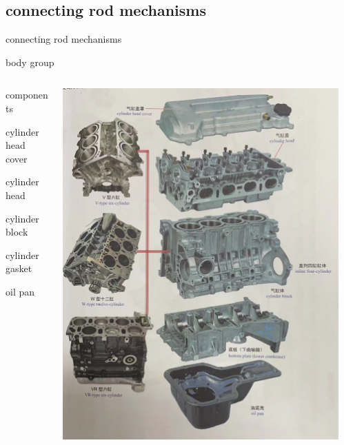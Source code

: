 \subsection{connecting rod mechanisms}
\begin{frame}{connecting rod mechanisms}
	\begin{block}{body group}
		\begin{columns}
			\begin{column}{0.4\textwidth}
					components
					\begin{compactitem}
						\item cylinder head cover
						\item cylinder head
						\item cylinder block
						\item cylinder gasket
						\item oil pan
					\end{compactitem}
			\end{column}
			\begin{column}{0.45\textwidth}
					\centering
					\includegraphics[width=0.95\textwidth]{2-13}
			\end{column}
		\end{columns}
	\end{block}
\end{frame}
